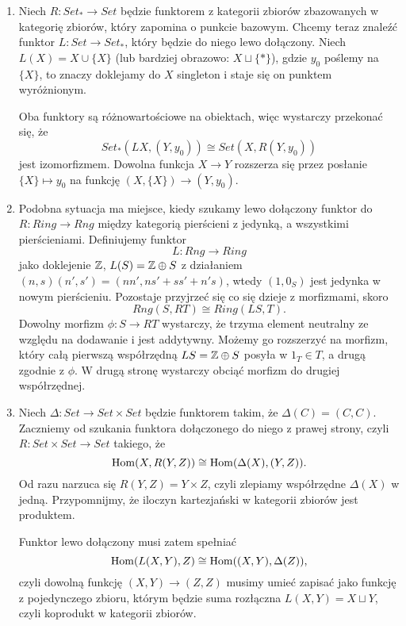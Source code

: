 \begin{enumerate}
  \item Niech $R:Set_*\to Set$ będzie funktorem z kategorii zbiorów zbazowanych w kategorię zbiorów, który zapomina o punkcie bazowym. Chcemy teraz znaleźć funktor $L:Set\to Set_*$, który będzie do niego lewo dołączony. Niech $L(X)=X\cup\{X\}$ (lub bardziej obrazowo: $X\sqcup\{*\}$), gdzie $y_0$ poślemy na $\{X\}$, to znaczy doklejamy do $X$ singleton i staje się on punktem wyróżnionym. 

    Oba funktory są różnowartościowe na obiektach, więc wystarczy przekonać się, że
    $$Set_*(LX, (Y, y_0))\cong Set(X, R(Y, y_0))$$
    jest izomorfizmem. Dowolna funkcja $X\to Y$ rozszerza się przez posłanie $\{X\}\mapsto y_0$ na funkcję $(X, \{X\})\to (Y, y_0)$.
  \item Podobna sytuacja ma miejsce, kiedy szukamy lewo dołączony funktor do $R:Ring\to Rng$ między kategorią pierścieni z jedynką, a wszystkimi pierścieniami. Definiujemy funktor 
    $$L:Rng\to Ring$$
    jako doklejenie $\mathbb{Z}$, $L(S)=\mathbb{Z}\oplus S$ z działaniem $(n, s)(n', s')=(nn', ns'+ss'+n's)$, wtedy $(1, 0_S)$ jest jedynka w nowym pierścieniu. Pozostaje przyjrzeć się co się dzieje z morfizmami, skoro
    $$Rng(S, RT)\cong Ring(LS, T).$$
    Dowolny morfizm $\phi:S\to RT$ wystarczy, że trzyma element neutralny ze względu na dodawanie i jest addytywny. Możemy go rozszerzyć na morfizm, który całą pierwszą współrzędną $LS=\mathbb{Z}\oplus S$ posyła w $1_T\in T$, a drugą zgodnie z $\phi$. W drugą stronę wystarczy obciąć morfizm do drugiej współrzędnej.
  \item Niech $\Delta:Set\to Set\times Set$ będzie funktorem takim, że  $\Delta(C)=(C, C)$. Zaczniemy od szukania funktora dołączonego do niego z prawej strony, czyli $R:Set\times Set\to Set$ takiego, że 
    $$\operatorname{Hom}(X, R(Y,Z))\cong\operatorname{Hom}(\Delta(X), (Y,Z)).$$
    Od razu narzuca się $R(Y,Z)=Y\times Z$, czyli zlepiamy współrzędne $\Delta(X)$ w jedną. Przypomnijmy, że iloczyn kartezjański w kategorii zbiorów jest produktem.

    Funktor lewo dołączony musi zatem spełniać
    $$\operatorname{Hom}(L(X,Y), Z)\cong \operatorname{Hom}((X,Y),\Delta(Z)),$$
    czyli dowolną funkcję $(X, Y)\to (Z, Z)$ musimy umieć zapisać jako funkcję z pojedynczego zbioru, którym będzie suma rozłączna $L(X,Y)=X\sqcup Y$, czyli koprodukt w kategorii zbiorów. 


\end{enumerate}
